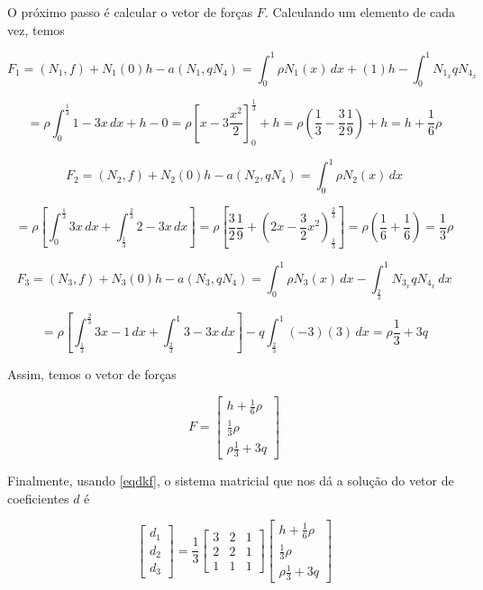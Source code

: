 \documentclass[12pt]{scrartcl}
\begin{document}
\endgroup

O próximo passo é calcular o vetor de forças $F$. Calculando um elemento de cada vez, temos

\[
    F_1 = (N_1, f) + N_1(0)h - a\left(N_1, qN_4\right) =
    \int_{0}^{1} \rho N_1(x) \, dx + (1)h - \int_{0}^{1} N_{1_x} qN_{4_x}
\]

\[
    = \rho \int_{0}^{\frac{1}{3}}  1 - 3x \, dx + h - 0 = \rho \left[x - 3\frac{x^2}{2}\right]_{0}^{\frac{1}{3}} + h
    = \rho \left(\frac{1}{3} - \frac{3}{2}\frac{1}{9}\right) + h = h + \frac{1}{6}\rho
\]

\[
    F_2 = (N_2, f) + N_2(0)h - a\left(N_2, qN_4\right) =
    \int_{0}^{1} \rho N_2(x) \, dx
\]

\[
    = \rho \left[\int_{0}^{\frac{1}{3}}  3x \, dx  + \int_{\frac{1}{3}}^{\frac{2}{3}}  2 - 3x \, dx\right] =
    \rho \left[\frac{3}{2}\frac{1}{9} + \left(2x - \frac{3}{2}x^2\right)_{\frac{1}{3}}^{\frac{2}{3}}  \right]
    = \rho \left(\frac{1}{6} + \frac{1}{6}\right) = \frac{1}{3}\rho
\]

\[
    F_3 = (N_3, f) + N_3(0)h - a\left(N_3, qN_4\right) =
    \int_{0}^{1} \rho N_3(x) \, dx - \int_{\frac{2}{3}}^{1} N_{3_x} qN_{4_x} \, dx
\]

\[
    = \rho \left[\int_{\frac{1}{3}}^{\frac{2}{3}}  3x - 1 \, dx  + \int_{\frac{2}{3}}^{1}  3 - 3x \, dx\right] - q\int_{\frac{2}{3}}^{1} (-3) (3) \, dx =
    \rho \frac{1}{3} + 3q
\]

Assim, temos o vetor de forças

\begingroup
\renewcommand*{\arraystretch}{2}

\[
    F =
    \begin{bmatrix}
        h + \frac{1}{6}\rho \\
        \frac{1}{3}\rho     \\
        \rho \frac{1}{3} + 3q
    \end{bmatrix}
\]

\endgroup

Finalmente, usando \eqref{eqdkf}, o sistema matricial que nos dá a solução do vetor de coeficientes $d$ é

\begingroup
\renewcommand*{\arraystretch}{2}

\[
    \begin{bmatrix}
        d_1 \\
        d_2 \\
        d_3
    \end{bmatrix} =
    \frac{1}{3}
    \begin{bmatrix}
        3 & 2 & 1 \\
        2 & 2 & 1 \\
        1 & 1 & 1
    \end{bmatrix}
    \begin{bmatrix}
        h + \frac{1}{6}\rho \\
        \frac{1}{3}\rho     \\
        \rho \frac{1}{3} + 3q
    \end{bmatrix}
\]
\end{document}
